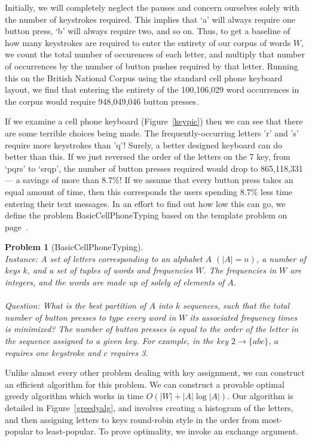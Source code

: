 \documentclass{article}
\newtheorem{problem}{Problem}
\begin{document}
Initially, we will completely neglect the pauses and concern ourselves solely
with the number of keystrokes required.  This implies that `a' will always
require one button press, `b' will always require two, and so on.  Thus, to get
a baseline of how many keystrokes are required to enter the entirety of our
corpus of words $W$, we count the total number of occurences of each letter,
and multiply that number of occurrences by the number of button pushes
required by that letter.  Running this on the British National Corpus
using the standard cell phone keyboard layout, we find that entering the
entirety of the 100,106,029 word occurrences in the corpus would require
948,049,046 button presses.  

If we examine a cell phone keyboard (Figure~\ref{keypic}) then we can see that
there are some terrible choices being made.  The frequently-occurring letters
'r' and 's' require more keystrokes than 'q'!  Surely, a better designed
keyboard can do better than this.  If we just reversed the order of the letters
on the 7 key, from `pqrs' to `srqp', the number of button presses required
would drop to 865,118,331 --- a savings of more than $8.7\%$!  If we assume
that every button press takes an equal amount of time, then this corresponds
the users spending $8.7\%$ less time entering their text messages.  In an
effort to find out how low this can go, we define the problem {\sc
BasicCellPhoneTyping} based on the template problem on
page~\pageref{probtemplate}.

\begin{problem}[{\sc BasicCellPhoneTyping}]~\\
{\sc Instance}: A set of letters corresponding to an alphabet $A$ $(|A| =
n)$, a number of keys $k$, and a set of
tuples of words and frequencies $W$.  The frequencies in $W$ are integers,
and the words are made up of solely of elements of $A$. \\
        ~\\
{\sc Question}: What is the best partition of $A$ into $k$ sequences, such that the
total number of button presses to type every word in $W$ its associated frequency
times is minimized?  The number of button presses is equal to the order of the
letter in the sequence assigned to a given key.  For example, in the key
$2\to\{abc\}$, $a$ requires one keystroke and $c$ requires 3.
\label{probtemplate}
\end{problem}

Unlike almost every other problem dealing with key assignment, we can construct
an efficient algorithm for this problem.  We can construct a provable optimal
greedy algorithm which works in time $O(|W| + |A| \log |A|)$.  Our algorithm is
detailed in Figure~\ref{greedyalg}, and involves creating a histogram of the
letters, and then assigning letters to keys round-robin style in the order from
most-popular to least-popular.  To prove optimality, we invoke an exchange argument.
\end{document}
